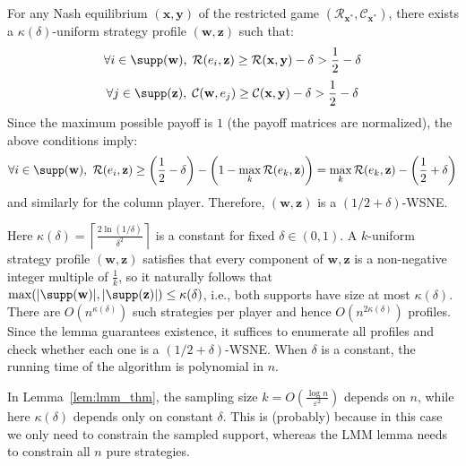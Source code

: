 \begin{lemma}
  For any Nash equilibrium \((\mathbf{x}, \mathbf{y})\) of the restricted game \((\mathcal{R}_{\mathbf{x}^*}, \mathcal{C}_{\mathbf{x}^*})\), there exists a \(\kappa(\delta)\)-uniform strategy profile \((\mathbf{w}, \mathbf{z})\) such that:
  \[
    \forall i \in \supp(\mathbf{w}),\; \mathcal{R}(e_i, \mathbf{z}) \ge \mathcal{R}(\mathbf{x}, \mathbf{y}) - \delta > \frac12 - \delta
  \]
  \[
    \forall j \in \supp(\mathbf{z}),\; \mathcal{C}(\mathbf{w}, e_j) \ge \mathcal{C}(\mathbf{x}, \mathbf{y}) - \delta > \frac12 - \delta
  \]
  Since the maximum possible payoff is \(1\) (the payoff matrices are normalized), the above conditions imply:
  \[
    \forall i \in \supp(\mathbf{w}),\ \mathcal{R}(e_i, \mathbf{z}) \ge \left(\frac12 - \delta\right) - \left(1 - \max_k \mathcal{R}(e_k, \mathbf{z})\right) = \max_k \mathcal{R}(e_k, \mathbf{z}) - \left(\frac12 + \delta\right)
  \]
  and similarly for the column player. Therefore, \((\mathbf{w}, \mathbf{z})\) is a \((1/2+\delta)\)-WSNE.
\end{lemma}

Here \(\kappa(\delta) = \left\lceil \frac{2 \ln (1/\delta)}{\delta^2} \right\rceil\) is a constant for fixed \(\delta \in (0,1)\). A \(k\)-uniform strategy profile \((\mathbf{w}, \mathbf{z})\) satisfies that every component of \(\mathbf{w}, \mathbf{z}\) is a non-negative integer multiple of \(\frac{1}{k}\), so it naturally follows that \(\max(|\supp(\mathbf{w})|, |\supp(\mathbf{z})|) \le \kappa(\delta)\), i.e., both supports have size at most \(\kappa(\delta)\). There are \(O(n^{\kappa(\delta)})\) such strategies per player and hence \(O(n^{2\kappa(\delta)})\) profiles. Since the lemma guarantees existence, it suffices to enumerate all profiles and check whether each one is a \((1/2+\delta)\)-WSNE. When \(\delta\) is a constant, the running time of the algorithm is polynomial in \(n\).

\begin{remark}
  In Lemma~\ref{lem:lmm_thm}, the sampling size \(k = O\left(\frac{\log n}{\varepsilon^2}\right)\) depends on \(n\), while here \(\kappa(\delta)\) depends only on constant \(\delta\). This is (probably) because in this case we only need to constrain the sampled support, whereas the LMM lemma needs to constrain all \(n\) pure strategies.
\end{remark}
